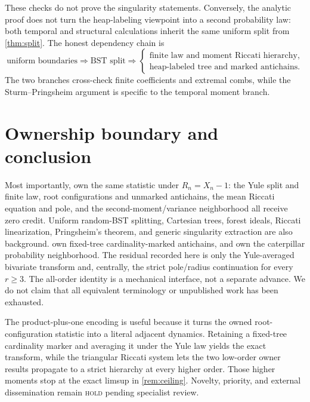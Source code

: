 \documentclass[10pt,a4paper]{amsart}
\theoremstyle{definition}
\theoremstyle{remark}
\begin{document}
These checks do not prove the singularity statements.  Conversely, the
analytic proof does not turn the heap-labeling viewpoint into a second
probability law: both temporal and structural calculations inherit the same
uniform split from \cref{thm:split}.  The honest dependency chain is
\[
 \text{uniform boundaries}
 \Longrightarrow \text{BST split}
 \Longrightarrow
 \begin{cases}
   \text{finite law and moment Riccati hierarchy},\\
   \text{heap-labeled tree and marked antichains}.
 \end{cases}
\]
The two branches cross-check finite coefficients and extremal combs, while
the Sturm--Pringsheim argument is specific to the temporal moment branch.

\section{Ownership boundary and conclusion}

Most importantly, \citet{DisantoEtAl2022} own the same statistic under
$R_n=X_n-1$: the Yule split and finite law, root configurations and unmarked
antichains, the mean Riccati equation and pole, and the second-moment/variance
neighborhood all receive zero credit.  Uniform random-BST splitting,
Cartesian trees, forest ideals, Riccati linearization, Pringsheim's theorem,
and generic singularity extraction are also background.
\citet{AndriantianaWagnerWang2013} own fixed-tree cardinality-marked
antichains, and \citet{ChangFuchs2010,Rosenberg2006} own the caterpillar
probability neighborhood.  The residual recorded here is only the
Yule-averaged bivariate transform and, centrally, the strict pole/radius
continuation for every $r\geq3$.  The all-order identity is a mechanical
interface, not a separate advance.  We do not claim that all equivalent
terminology or unpublished work has been exhausted.

The product-plus-one encoding is useful because it turns the owned
root-configuration statistic into a literal adjacent dynamics.  Retaining a
fixed-tree cardinality marker and averaging it under the Yule law yields the
exact transform, while the triangular Riccati system lets the two low-order
owner results propagate to a strict hierarchy at every higher order.  Those higher moments stop at the exact limsup in
\cref{rem:ceiling}.  Novelty, priority, and external dissemination remain
\textsc{hold} pending specialist review.



\end{document}
